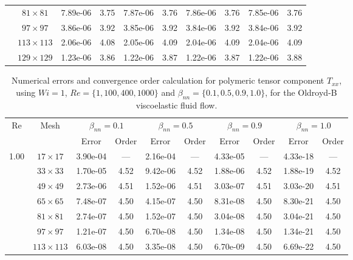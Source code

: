 \documentclass[preprint, 12pt]{elsarticle}
\begin{document}
\begin{center}
\begin{table}[H]
{\begin{tabular*}{\textwidth}{@{\extracolsep\fill}cccccccccc@{}}
    & $81\times 81$ & 7.89e-06 & 3.75 & 7.87e-06 & 3.76 & 7.86e-06 & 3.76 & 7.85e-06 & 3.76 \\
    & $97\times 97$ & 3.86e-06 & 3.92 & 3.85e-06 & 3.92 & 3.84e-06 & 3.92 & 3.84e-06 & 3.92 \\
    & $113\times 113$ & 2.06e-06 & 4.08 & 2.05e-06 & 4.09 & 2.04e-06 & 4.09 & 2.04e-06 & 4.09 \\
    & $129\times 129$ & 1.23e-06 & 3.86 & 1.22e-06 & 3.87 & 1.22e-06 & 3.87 & 1.22e-06 & 3.88 \\
    \hline
    \end{tabular*}
}
\end{table}
\end{center}

\begin{center}
\begin{table}[H]
\caption{Numerical errors and convergence order calculation for polymeric tensor component $T_{xx}$, using $Wi=1$, $Re=\{1,100,400,1000\}$ and $\beta_{nn}=\{0.1,0.5,0.9,1.0\}$, for the Oldroyd-B viscoelastic fluid flow.\label{tab_OldroydBTxxResumida}}
\scriptsize{
    \begin{tabular*}{\textwidth}{@{\extracolsep\fill}cccccccccc@{}}
    \hline
    \multirow{2}{*}{$\operatorname{Re}$} & \multirow{2}{*}{Mesh} & \multicolumn{2}{c}{$\beta_{nn}=0.1$}  & \multicolumn{2}{c}{$\beta_{nn}=0.5$}  & \multicolumn{2}{c}{$\beta_{nn}=0.9$}  & \multicolumn{2}{c}{$\beta_{nn}=1.0$}\\ %
     & & Error & Order & Error & Order & Error & Order & Error & Order \\
    \hline
    \multirow{7}{*}{1.00} & $17\times 17$ & 3.90e-04 & --- & 2.16e-04 & --- & 4.33e-05 & --- & 4.33e-18 & --- \\
    & $33\times 33$ & 1.70e-05 & 4.52 & 9.42e-06 & 4.52 & 1.88e-06 & 4.52 & 1.88e-19 & 4.52 \\
    & $49\times 49$ & 2.73e-06 & 4.51 & 1.52e-06 & 4.51 & 3.03e-07 & 4.51 & 3.03e-20 & 4.51 \\
    & $65\times 65$ & 7.48e-07 & 4.50 & 4.15e-07 & 4.50 & 8.31e-08 & 4.50 & 8.30e-21 & 4.50 \\
    & $81\times 81$ & 2.74e-07 & 4.50 & 1.52e-07 & 4.50 & 3.04e-08 & 4.50 & 3.04e-21 & 4.50 \\
    & $97\times 97$ & 1.21e-07 & 4.50 & 6.70e-08 & 4.50 & 1.34e-08 & 4.50 & 1.34e-21 & 4.50 \\
    & $113\times 113$ & 6.03e-08 & 4.50 & 3.35e-08 & 4.50 & 6.70e-09 & 4.50 & 6.69e-22 & 4.50 \\

\end{tabular*}}
\end{table}
\end{center}
\end{document}
